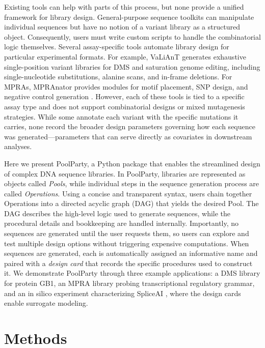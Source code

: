 \documentclass[twoside]{kinney_lab_preprintstyle}
\begin{document}
Existing tools can help with parts of this process, but none provide a unified framework for library design. General-purpose sequence toolkits \citep{Cock2009df, Pereira2015wj, Klie2023kg} can manipulate individual sequences but have no notion of a variant library as a structured object. Consequently, users must write custom scripts to handle the combinatorial logic themselves. Several assay-specific tools automate library design for particular experimental formats. For example, VaLiAnT \citep{Barbon2022th} generates exhaustive single-position variant libraries for DMS and saturation genome editing, including single-nucleotide substitutions, alanine scans, and in-frame deletions. For MPRAs, MPRAnator \citep{GeorgakopoulosSoares2017gb} provides modules for motif placement, SNP design, and negative control generation \citep[see also][]{Ghazi2018aa}. However, each of these tools is tied to a specific assay type and does not support combinatorial designs or mixed mutagenesis strategies. While some annotate each variant with the specific mutations it carries, none record the broader design parameters governing how each sequence was generated---parameters that can serve directly as covariates in downstream analyses. 

Here we present PoolParty, a Python package that enables the streamlined design of complex DNA sequence libraries. In PoolParty, libraries are represented as objects called \emph{Pools}, while individual steps in the sequence generation process are called \emph{Operations}. Using a concise and transparent syntax, users chain together Operations into a directed acyclic graph (DAG) that yields the desired Pool. The DAG describes the high-level logic used to generate sequences, while the procedural details and bookkeeping are handled internally. Importantly, no sequences are generated until the user requests them, so users can explore and test multiple design options without triggering expensive computations. When sequences are generated, each is automatically assigned an informative name and paired with a \emph{design card} that records the specific procedures used to construct it. We demonstrate PoolParty through three example applications: a DMS library for protein GB1, an MPRA library probing transcriptional regulatory grammar, and an in silico experiment characterizing SpliceAI \citep{Jaganathan2019ps}, where the design cards enable surrogate modeling.

\section*{Methods}
\end{document}
